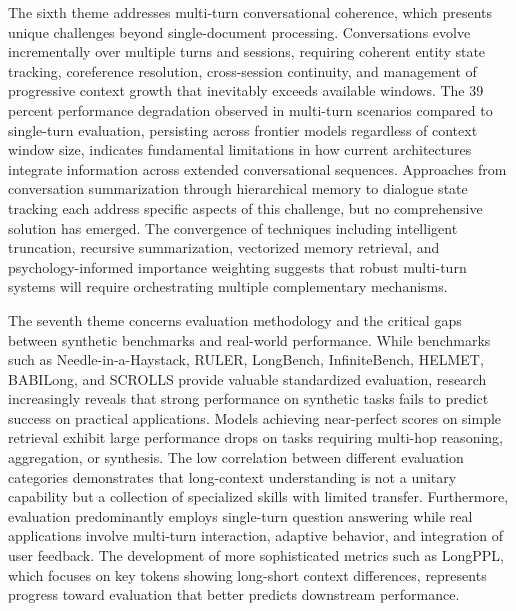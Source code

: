 \documentclass[11pt,letterpaper]{article}
\begin{document}
The sixth theme addresses multi-turn conversational coherence, which presents unique challenges beyond single-document processing. Conversations evolve incrementally over multiple turns and sessions, requiring coherent entity state tracking, coreference resolution, cross-session continuity, and management of progressive context growth that inevitably exceeds available windows. The 39 percent performance degradation observed in multi-turn scenarios compared to single-turn evaluation, persisting across frontier models regardless of context window size, indicates fundamental limitations in how current architectures integrate information across extended conversational sequences. Approaches from conversation summarization through hierarchical memory to dialogue state tracking each address specific aspects of this challenge, but no comprehensive solution has emerged. The convergence of techniques including intelligent truncation, recursive summarization, vectorized memory retrieval, and psychology-informed importance weighting suggests that robust multi-turn systems will require orchestrating multiple complementary mechanisms.

The seventh theme concerns evaluation methodology and the critical gaps between synthetic benchmarks and real-world performance. While benchmarks such as Needle-in-a-Haystack, RULER, LongBench, InfiniteBench, HELMET, BABILong, and SCROLLS provide valuable standardized evaluation, research increasingly reveals that strong performance on synthetic tasks fails to predict success on practical applications. Models achieving near-perfect scores on simple retrieval exhibit large performance drops on tasks requiring multi-hop reasoning, aggregation, or synthesis. The low correlation between different evaluation categories demonstrates that long-context understanding is not a unitary capability but a collection of specialized skills with limited transfer. Furthermore, evaluation predominantly employs single-turn question answering while real applications involve multi-turn interaction, adaptive behavior, and integration of user feedback. The development of more sophisticated metrics such as LongPPL, which focuses on key tokens showing long-short context differences, represents progress toward evaluation that better predicts downstream performance.
\end{document}
